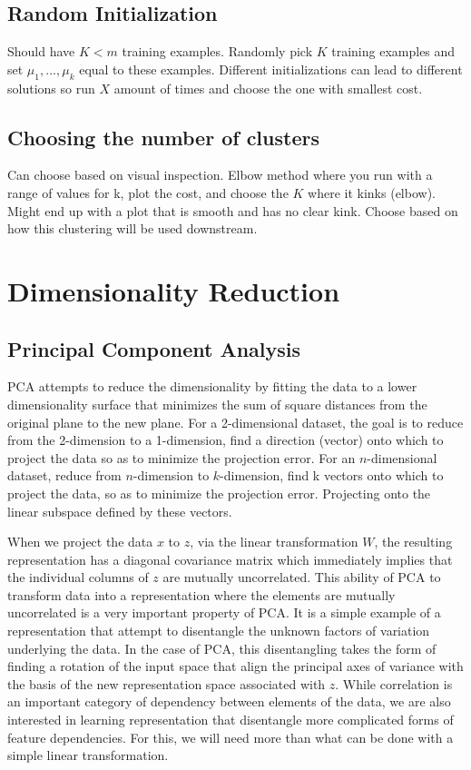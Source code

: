 \documentclass[12pt]{article}
\begin{document}
\begin{&itemize}
\subsection{Random Initialization}
Should have $K<m$ training examples. Randomly pick $K$ training examples and set $\mu_1,...,\mu_k$ equal to these examples. Different initializations can lead to different solutions so run $X$ amount of times and choose the one with smallest cost.

\subsection{Choosing the number of clusters}
Can choose based on visual inspection. Elbow method where you run with a range of values for k, plot the cost, and choose the $K$ where it kinks (elbow). Might end up with a plot that is smooth and has no clear kink. Choose based on how this clustering will be used downstream.

\section{Dimensionality Reduction}
\subsection{Principal Component Analysis}
PCA attempts to reduce the dimensionality by fitting the data to a lower dimensionality surface that minimizes the sum of square distances from the original plane to the new plane. For a 2-dimensional dataset, the goal is to reduce from the 2-dimension to a 1-dimension, find a direction (vector) onto which to project the data so as to minimize the projection error. For an $n$-dimensional dataset, reduce from $n$-dimension to $k$-dimension, find k vectors onto which to project the data, so as to minimize the projection error. Projecting onto the linear subspace defined by these vectors.

When we project the data $x$ to $z$, via the linear transformation $W$, the resulting representation has a diagonal covariance matrix which immediately implies that the individual columns of $z$ are mutually uncorrelated.  This ability of PCA to transform data into a representation where the elements are mutually uncorrelated is a very important property of PCA. It is a simple example of a representation that attempt to disentangle the unknown factors of variation underlying the data. In the case of PCA, this disentangling takes the form of finding a rotation of the input space that align the principal axes of variance with the basis of the new representation space associated with $z$. While correlation is an important category of dependency between elements of the data, we are also interested in learning representation that disentangle more complicated forms of feature dependencies. For this, we will need more than what can be done with a simple linear transformation.


\end{&itemize}
\end{document}
